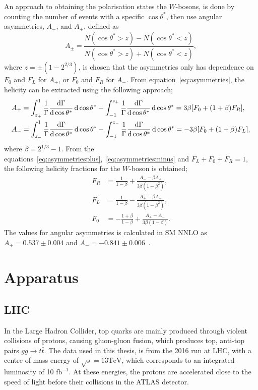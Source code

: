 \documentclass[12pt,a4paper]{article}
\numberwithin{equation}{section}
\begin{document}
An approach to obtaining the polarisation states the $W$-bosons, is done by
counting the number of events with a specific $\cos \theta^*$, then use angular
asymmetries, $A_-$, and $A_+$, defined as
\begin{equation}\label{eq:asymmetries}
  A_{\pm}=\frac{N(\cos \theta^* > z)-N(\cos \theta^* < z)}{N(\cos \theta^* > z)+N(\cos \theta^* < z)},
\end{equation}
where $z=\pm(1-2^{2/3})$, is chosen that the asymmetries only has dependence on
$F_0$ and $F_L$ for $A_+$, or $F_0$ and $F_R$ for $A_-$. From
equation~\eqref{eq:asymmetries}, the helicity can be extracted using the
following approach;
\begin{align}
\label{eq:asymmetriesplus}
  A_+ &= \int^1_{z_+} \frac{1}{\Gamma}\dv{\Gamma}{\cos \theta^*} \dd{\cos \theta^{*}} - \int^{z_+}_{-1}
      \frac{1}{\Gamma}\dv{\Gamma}{\cos \theta^*} \dd{\cos \theta^{*}} = 3\beta [F_0 + (1+\beta)F_R],\\
\label{eq:asymmetriesminus}
  A_- &= \int^1_{z_-} \frac{1}{\Gamma}\dv{\Gamma}{\cos \theta^*} \dd{\cos \theta^{*}} - \int^{z_-}_{-1}
      \frac{1}{\Gamma}\dv{\Gamma}{\cos \theta^*} \dd{\cos \theta^{*}} = -3\beta [F_0 + (1+\beta)F_L],
\end{align}
where $\beta = 2^{1/3}-1$. From the
equations~\eqref{eq:asymmetriesplus},~\eqref{eq:asymmetriesminus} and
$F_L+F_0+F_R=1$, the following helicity fractions for the $W$-boson is obtained;
\begin{align}
  F_R&=\frac{1}{1-\beta}+\frac{A_- - \beta A_+}{3\beta (1-\beta^2)},\\
  F_L&=\frac{1}{1-\beta}-\frac{A_+ - \beta A_-}{3\beta (1-\beta^2)},\\
  F_0&=-\frac{1+\beta}{1-\beta}+\frac{A_+ - A_-}{3\beta (1-\beta)}.
\end{align}
The values for angular asymmetries is calculated in SM
NNLO as $A_+=0.537 \pm 0.004$ and
$A_-=-0.841 \pm 0.006$~\cite[24]{CastroNunesFiolhais:1544047}.

\section{Apparatus}
\subsection{LHC}
In the Large Hadron Collider, top quarks are mainly produced through violent
collisions of protons, causing gluon-gluon fusion, which produces top, anti-top
pairs $gg \rightarrow t\bar t$. The data used in this thesis, is from the 2016 run at LHC,
with a centre-of-mass energy of $\sqrt s = 13 \mathrm{TeV}$, which corresponds
to an integrated luminosity of 10 $\mathrm{fb}^{-1}$\cite{oreach2020}. At these
energies, the protons are accelerated close to the speed of light before their
collisions in the ATLAS detector.\\
\end{document}
